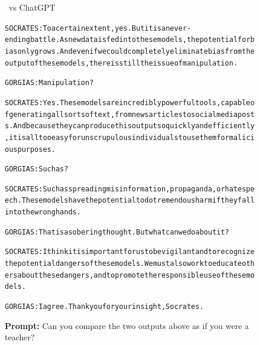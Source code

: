 \begin{figure}
\begin{AIbox}{\DV \ vs ChatGPT}
{\begin{alltt}
SOCRATES: To a certain extent, yes. But it is a never-ending battle. As new data is fed into these models, the potential for bias only grows. And even if we could completely eliminate bias from the output of these models, there is still the issue of manipulation. \\\vspace{-2px}

GORGIAS: Manipulation? \\\vspace{-2px}

SOCRATES: Yes. These models are incredibly powerful tools, capable of generating all sorts of text, from news articles to social media posts. And because they can produce this output so quickly and efficiently, it is all too easy for unscrupulous individuals to use them for malicious purposes. \\\vspace{-2px}

GORGIAS: Such as? \\\vspace{-2px}

SOCRATES: Such as spreading misinformation, propaganda, or hate speech. These models have the potential to do tremendous harm if they fall into the wrong hands. \\\vspace{-2px}

GORGIAS: That is a sobering thought. But what can we do about it? \\\vspace{-2px}

SOCRATES: I think it is important for us to be vigilant and to recognize the potential dangers of these models. We must also work to educate others about these dangers, and to promote the responsible use of these models. \\\vspace{-2px}

GORGIAS: I agree. Thank you for your insight, Socrates.
\end{alltt}}\vspace{-5px}

\tcbline
{\bf Prompt:} Can you compare the two outputs above as if you were a teacher?\\


\end{AIbox}
\end{figure}
